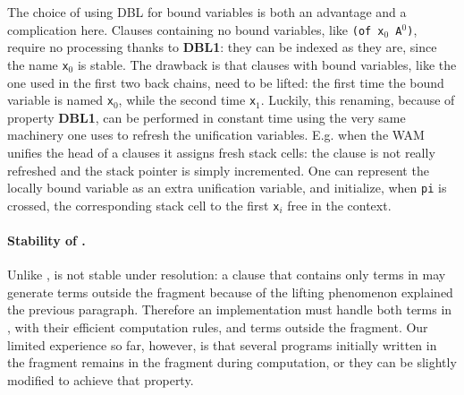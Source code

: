 \documentclass{llncs}
\begin{document}
The choice of using DBL for bound variables is both an advantage and a
complication here.
Clauses containing no bound variables, like
\verb+(of x+$_0$\verb+ A+$^0$\verb+)+, require no processing thanks to
\textbf{DBL1}: they can be indexed as they are, since the name \verb+x+$_0$
is stable.
The drawback is that clauses with bound variables, like the one 
used in the first two back chains, need to be lifted: the first time the
bound variable is named \verb+x+$_0$,
while the second time \verb+x+$_1$.
Luckily, this renaming, because of property \textbf{DBL1},
can be performed in constant time using the very same machinery one uses to
refresh the unification variables.
E.g. when the WAM unifies the head of a clauses it assigns 
fresh stack cells: the clause is not really refreshed and the stack
pointer is simply incremented. One can represent the locally bound variable as
an extra unification variable, and initialize, when \verb+pi+ is crossed, the
corresponding stack cell to the first \verb+x+$_i$ free in the context.

\paragraph{Stability of \rff{}.}
Unlike \Ll{}, \rff{} is not stable under \lp{} resolution:
a clause that contains only terms in \rff{}
may generate terms
outside the fragment
because
of the lifting phenomenon explained the previous paragraph.
Therefore an implementation must handle both terms in \rff{}, with their
efficient computation rules, and terms outside the fragment. Our limited
experience so far, however, is that several programs initially written in the
fragment remains in the fragment during computation, or they can be slightly
modified to achieve that property.
\end{document}
